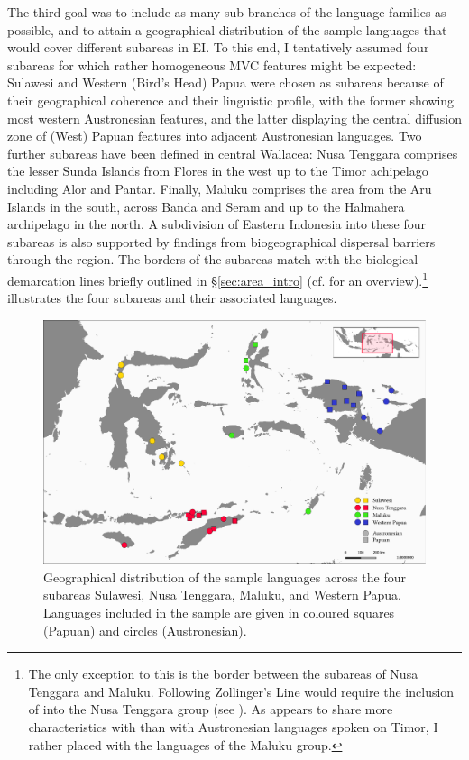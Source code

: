 The third goal was to include as many sub-branches of the language families as possible, and to attain a geographical distribution of the sample languages that would cover different subareas in EI. To this end, I tentatively assumed four subareas for which rather homogeneous MVC features might be expected: Sulawesi and Western (Bird's Head) Papua were chosen as subareas because of their geographical coherence and their linguistic profile, with the former showing most western Austronesian features, and the latter displaying the central diffusion zone of (West) Papuan features into adjacent Austronesian languages. Two further subareas have been defined in central Wallacea: Nusa Tenggara comprises the lesser Sunda Islands from Flores in the west up to the Timor achipelago including Alor and Pantar. Finally, Maluku comprises the area from the Aru Islands in the south, across Banda and Seram and up to the Halmahera archipelago in the north. A subdivision of Eastern Indonesia into these four subareas is also supported by findings from biogeographical dispersal barriers through the region. The borders of the subareas match with the biological demarcation lines briefly outlined in §\ref{sec:area_intro} (cf.  for an overview).\footnote{The only exception to this is the border between the subareas of Nusa Tenggara and Maluku. Following Zollinger's Line would require the inclusion of  into the Nusa Tenggara group (see ). As  appears to share more characteristics with  than with Austronesian languages spoken on Timor, I rather placed  with the languages of the Maluku group.}  illustrates the four subareas and their associated languages. 

\begin{figure}
\includegraphics[width=\columnwidth]{figures/languages_subareas.pdf}
\caption[Geographical distribution of the sample languages across subareas]{Geographical distribution of the sample languages across the four subareas Sulawesi, Nusa Tenggara, Maluku, and Western Papua. Languages included in the sample are given in coloured squares (Papuan) and circles (Austronesian).}\label{map:subareas}
\end{figure}

